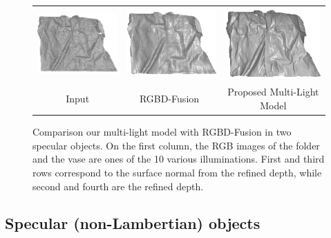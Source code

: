\begin{figure}[!ht]
{\begin{tabular}{c|c c}
   \includegraphics[height = 0.24\linewidth]{figures/result/robust_patternShirt_shape_init.pdf} 
   &
   \includegraphics[height = 0.24\linewidth]{figures/result/rgbd_patternShirt_shape.pdf} &
   \includegraphics[height = 0.24\linewidth]{figures/result/robust_patternShirt_shape.pdf}\\


   {Input} & {RGBD-Fusion~\cite{or2015rgbd}} & {Proposed Multi-Light Model}               
 \end{tabular}}
\caption{Comparison our multi-light model with RGBD-Fusion in two specular objects. On the first column, the RGB images of the folder and the vase are ones of  the 10 various illuminations. First and third rows correspond to the surface normal from the refined depth, while second and fourth are the refined depth.}
\label{fig:comp_complicated_albedo}
\end{figure}

\subsection{Specular (non-Lambertian) objects}


